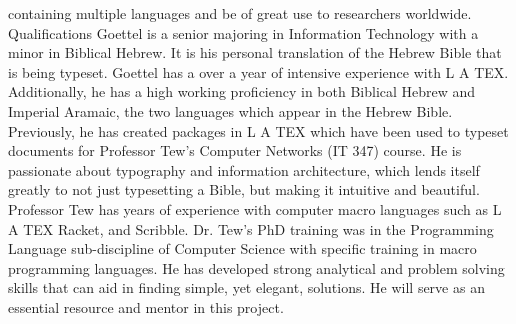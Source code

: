 \documentclass{acm_proc_article-sp}
\begin{document}
containing multiple languages and be of great use to researchers worldwide.
Qualifications
Goettel is a senior majoring in Information Technology with a minor in Biblical Hebrew. It is his personal
translation of the Hebrew Bible that is being typeset. Goettel has a over a year of intensive experience with
L A TEX. Additionally, he has a high working proficiency in both Biblical Hebrew and Imperial Aramaic, the
two languages which appear in the Hebrew Bible. Previously, he has created packages in L A TEX which have
been used to typeset documents for Professor Tew’s Computer Networks (IT 347) course. He is passionate
about typography and information architecture, which lends itself greatly to not just typesetting a Bible,
but making it intuitive and beautiful.
Professor Tew has years of experience with computer macro languages such as L A TEX Racket, and Scribble.
Dr. Tew’s PhD training was in the Programming Language sub-discipline of Computer Science with specific
training in macro programming languages. He has developed strong analytical and problem solving skills
that can aid in finding simple, yet elegant, solutions. He will serve as an essential resource and mentor in
this project.



\nocite{*}
\end{document}
